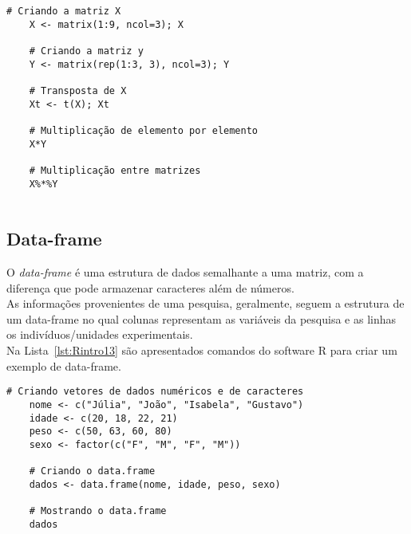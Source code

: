 \documentclass[11pt,fleqn]{book} %
\begin{document}
\begin{scriptsize}
	\estiloR
	\begin{lstlisting}[caption={Comandos do software R}, label=lst:Rintro12]
	# Criando a matriz X
	X <- matrix(1:9, ncol=3); X

	# Criando a matriz y
	Y <- matrix(rep(1:3, 3), ncol=3); Y
	
	# Transposta de X
	Xt <- t(X); Xt
	
	# Multiplicação de elemento por elemento
	X*Y
	
	# Multiplicação entre matrizes
	X%*%Y
	
	\end{lstlisting}
\end{scriptsize}

\vspace{0.5cm}


\subsection{Data-frame}

O {\itshape data-frame} é uma estrutura de dados semalhante a uma matriz, com a diferença que pode armazenar caracteres além de números. \\
As informações provenientes de uma pesquisa, geralmente, seguem a estrutura de um data-frame no qual colunas representam as variáveis da pesquisa e as linhas os indivíduos/unidades experimentais. \\

Na Lista~\ref{lst:Rintro13} são apresentados comandos do software R para criar um exemplo de data-frame. \\

\begin{scriptsize}
	\estiloR
	\begin{lstlisting}[caption={Comandos do software R}, label=lst:Rintro13]
	# Criando vetores de dados numéricos e de caracteres
	nome <- c("Júlia", "João", "Isabela", "Gustavo")
	idade <- c(20, 18, 22, 21)
	peso <- c(50, 63, 60, 80)
	sexo <- factor(c("F", "M", "F", "M"))
	
	# Criando o data.frame
	dados <- data.frame(nome, idade, peso, sexo)
	
	# Mostrando o data.frame
	dados
	
	\end{lstlisting}
\end{scriptsize}
\end{document}
